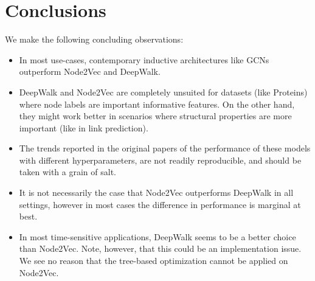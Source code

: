 \documentclass[sigconf]{acmart}
\begin{document}
\section{Conclusions}
We make the following concluding observations:
\begin{itemize}
    \item In most use-cases, contemporary inductive architectures like GCNs outperform Node2Vec and DeepWalk.
    \item DeepWalk and Node2Vec are completely unsuited for datasets (like Proteins) where node labels are important informative features. On the other hand, they might work better in scenarios where structural properties are more important (like in link prediction).
    \item The trends reported in the original papers of the performance of these models with different hyperparameters, are not readily reproducible, and should be taken with a grain of salt.
    \item It is not necessarily the case that Node2Vec outperforms DeepWalk in all settings, however in most cases the difference in performance is marginal at best.
    \item In most time-sensitive applications, DeepWalk seems to be a better choice than Node2Vec. Note, however, that this could be an implementation issue. We see no reason that the tree-based optimization cannot be applied on Node2Vec.
\end{itemize}



\pagebreak\clearpage
\end{document}
